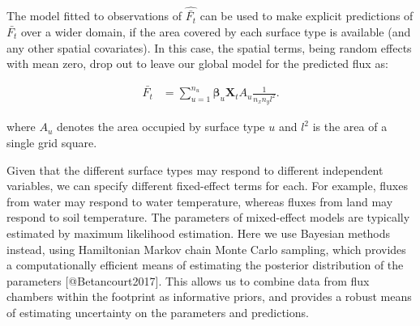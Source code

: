 The model fitted to observations of $\widehat{\bar{F_t}}$ can be used to make explicit predictions of $\bar{F_t}$ over a wider domain, if the area covered by each surface type is available (and any other spatial covariates). In this case, the spatial terms, being random effects with mean zero, drop out to leave our global model for the predicted flux as:

\begin{align}   \label{eq:pred_Fbar}
  \bar{F_t} &= \sum_{u = 1}^{n_u} \boldsymbol{\beta}_u \mathbf{X}_t A_{u} \frac{1}{n_x n_y l^2}.
\end{align}

where $A_{u}$ denotes the area occupied by surface type $u$ and $l^2$ is the area of a single grid square.

Given that the different surface types may respond to different independent variables, we can specify different fixed-effect terms for each.  For example, fluxes from water may respond to water temperature, whereas fluxes from land may respond to soil temperature. The parameters of mixed-effect models are typically estimated by maximum likelihood estimation. Here we use Bayesian methods instead, using Hamiltonian Markov chain Monte Carlo sampling, which provides a computationally efficient means of estimating the posterior distribution of the parameters [@Betancourt2017]. This allows us to combine data from flux chambers within the footprint as informative priors, and provides a robust means of estimating uncertainty on the parameters and predictions.

